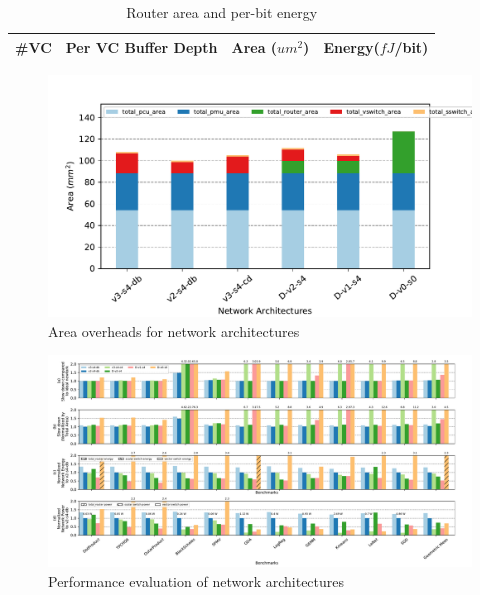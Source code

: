 \documentclass[portrait,a0,final]{a0poster}
\begin{document}
\begin{multicols}{3}
\begin{table}
\centering
\footnotesize
  \begin{tabular*}{\columnwidth}{>{\centering\arraybackslash}m{1.25cm}|>{\centering\arraybackslash}m{1.75cm}|>{\centering\arraybackslash}m{1.75cm}|>{\centering\arraybackslash}m{1.75cm}}
    \bottomrule
    \#VC & Per VC Buffer Depth & Area ($um^2$) & Energy($fJ$/bit) \\\hline
    
    \bottomrule
  \end{tabular*}
  \caption{Router area and per-bit energy}
  \label{tab:router}
\end{table}

\begin{figure}[H]
\caption{Area overheads for network architectures}
\label{fig:area}
\centering
\includegraphics[width=1\linewidth]{figs/area.pdf}
\end{figure}

\begin{figure}[H]
\caption{Performance evaluation of network architectures}
\label{fig:slow_down}
\centering
\includegraphics[width=1\linewidth]{figs/slow_down.pdf}
\end{figure}


\end{multicols}
\end{document}
